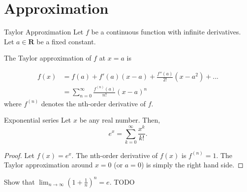 \section{Approximation}
\begin{fact}{Taylor Approximation}{}
  Let $f$ be a continuous function with infinite derivatives.
  Let $a\in \textbf{R}$ be a fixed constant.

  The Taylor approximation of $f$ at $x=a$ is

  \begin{align}
    f(x) &= f(a) + f'(a)(x-a) + \frac{f''(a)}{2!}(x-a^2)+...\\
         &= \sum^{\infty}_{n=0}\frac{f^{(n)}(a)}{n!}(x-a)^n
  \end{align}
  where $f^{(n)}$ denotes the nth-order derivative of $f$.
\end{fact}


\begin{fact}{Exponential series}{}
  Let $x$ be any real number. Then,
  \[
    e^x = \sum_{k=0}^{\infty}\frac{x^k}{k!}.
  \]
  \tcblower
  \begin{proof}
    Let $f(x) = e^x$.
    The nth-order derivative of $f(x)$ is $f^{(n)}=1$.
    The Taylor approximation around $x=0$ (or $a=0$) is simply the right hand side.
  \end{proof}
\end{fact}

\begin{exec}
   Show that $\lim_{n\rightarrow\infty}(1+\frac{1}{n})^n=e$.
   \tcblower
   TODO
\end{exec}
